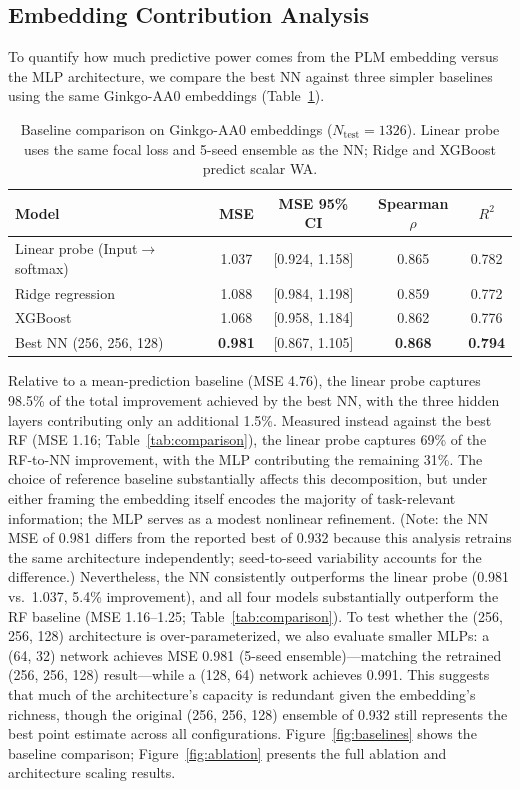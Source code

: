 \documentclass[12pt]{article}
\begin{document}
\subsection{Embedding Contribution Analysis}
\label{sec:baselines}

To quantify how much predictive power comes from the PLM embedding versus the MLP architecture, we compare the best NN against three simpler baselines using the same Ginkgo-AA0 embeddings (Table~\ref{tab:baselines}).

\begin{table}[H]
\centering
\caption{Baseline comparison on Ginkgo-AA0 embeddings ($N_\text{test} = 1326$). Linear probe uses the same focal loss and 5-seed ensemble as the NN; Ridge and XGBoost predict scalar WA.}
\label{tab:baselines}
\begin{tabular}{lcccc}
\toprule
Model & MSE & MSE 95\% CI & Spearman $\rho$ & $R^2$ \\
\midrule
Linear probe (Input$\to$softmax) & 1.037 & [0.924, 1.158] & 0.865 & 0.782 \\
Ridge regression & 1.088 & [0.984, 1.198] & 0.859 & 0.772 \\
XGBoost & 1.068 & [0.958, 1.184] & 0.862 & 0.776 \\
Best NN (256, 256, 128) & \textbf{0.981} & [0.867, 1.105] & \textbf{0.868} & \textbf{0.794} \\
\bottomrule
\end{tabular}
\end{table}

Relative to a mean-prediction baseline (MSE 4.76), the linear probe captures 98.5\% of the total improvement achieved by the best NN, with the three hidden layers contributing only an additional 1.5\%.
Measured instead against the best RF (MSE 1.16; Table~\ref{tab:comparison}), the linear probe captures 69\% of the RF-to-NN improvement, with the MLP contributing the remaining 31\%.
The choice of reference baseline substantially affects this decomposition, but under either framing the embedding itself encodes the majority of task-relevant information; the MLP serves as a modest nonlinear refinement.
(Note: the NN MSE of 0.981 differs from the reported best of 0.932 because this analysis retrains the same architecture independently; seed-to-seed variability accounts for the difference.)
Nevertheless, the NN consistently outperforms the linear probe (0.981 vs.\ 1.037, 5.4\% improvement), and all four models substantially outperform the RF baseline (MSE 1.16--1.25; Table~\ref{tab:comparison}).
To test whether the (256, 256, 128) architecture is over-parameterized, we also evaluate smaller MLPs: a (64, 32) network achieves MSE 0.981 (5-seed ensemble)---matching the retrained (256, 256, 128) result---while a (128, 64) network achieves 0.991.
This suggests that much of the architecture's capacity is redundant given the embedding's richness, though the original (256, 256, 128) ensemble of 0.932 still represents the best point estimate across all configurations.
Figure~\ref{fig:baselines} shows the baseline comparison; Figure~\ref{fig:ablation} presents the full ablation and architecture scaling results.
\end{document}
